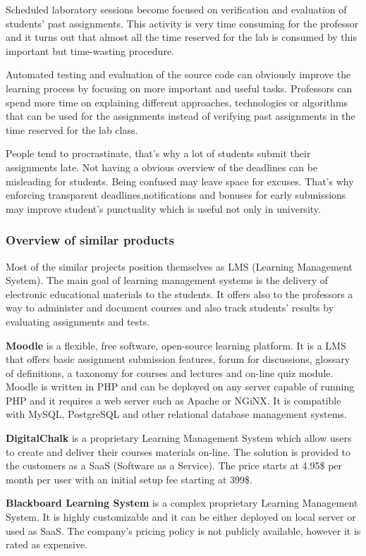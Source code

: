 \documentclass[12pt,oneside,a4paper]{article}
\begin{document}
Scheduled laboratory sessions become focused on verification and evaluation of students' past assignments. This activity is very time consuming for the professor and it turns out that almost all the time reserved for the lab is consumed by this important but time-wasting procedure.

Automated testing and evaluation of the source code can obviously improve the learning process by focusing on more important and useful tasks. Professors can spend more time on explaining different approaches, technologies or algorithms that can be used for the assignments instead of verifying past assignments in the time reserved for the lab class.

People tend to procrastinate, that's why a lot of students submit their assignments late. Not having a obvious overview of the deadlines can be misleading for students. Being confused may leave space for excuses. That's why enforcing transparent deadlines,notifications and bonuses for early submissions may improve student's punctuality which is useful not only in university.

\subsubsection{Overview of similar products}
Most of the similar projects position themselves as LMS (Learning Management System). The main goal of learning management systems is the delivery of electronic educational materials to the students. It offers also to the professors a way to administer and document courses and also track students' results by evaluating assignments and tests.

\textbf{Moodle} is a flexible, free software, open-source learning platform. It is a LMS that offers basic assignment submission features, forum for discussions, glossary of definitions, a taxonomy for courses and lectures and on-line quiz module. Moodle is written in PHP and can be deployed on any server capable of running PHP and it requires a web server such as Apache or NGiNX. It is compatible with MySQL, PostgreSQL and other relational database management systems.

\textbf{DigitalChalk} is a proprietary Learning Management System which allow users to create and deliver their courses materials on-line. The solution is provided to the customers as a SaaS (Software as a Service). The price starts at 4.95\$ per month per user with an initial setup fee starting at 399\$.

\textbf{Blackboard Learning System} is a complex proprietary Learning Management System. It is highly customizable and it can be either deployed on local server or used as SaaS. The company's pricing policy is not publicly available, however it is rated as expensive.
\end{document}

